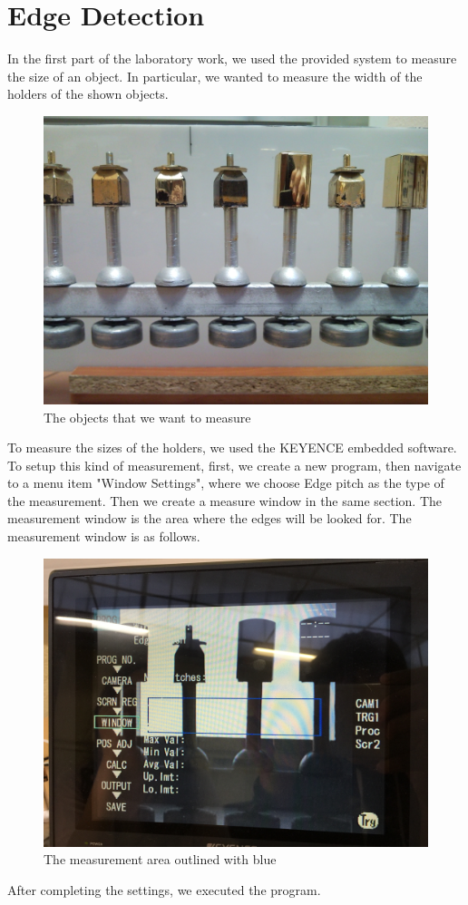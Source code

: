 \documentclass[english]{article}
\begin{document}
\section{Edge Detection}
In the first part of the laboratory work, we used the provided system to measure the size of an object.
In particular, we wanted to measure the width of the holders of the shown objects.\\
\begin{figure}[H]
	\centering
	\includegraphics[width=0.45\linewidth]{Pictures/SNC00006.jpg}
	\caption{The objects that we want to measure}
	\label{fig:origobj}
\end{figure} 
To measure the sizes of the holders, we used the KEYENCE embedded software.
To setup this kind of measurement, first, we create a new program, then navigate to a menu item "Window Settings", where we choose Edge pitch as the type of the measurement.
Then we create a measure window in the same section.
The measurement window is the area where the edges will be looked for. The measurement window is as follows.
\begin{figure}[H]
	\centering
	\includegraphics[width=0.6\linewidth]{Pictures/IMG_1221.JPG}
	\caption{The measurement area outlined with blue}
	\label{fig:measwind}
\end{figure} 

After completing the settings, we executed the program.
\end{document}
